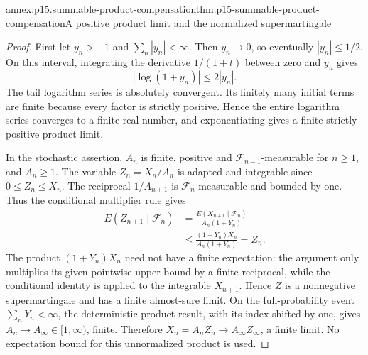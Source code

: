 \begin{annexitem}{annex:p15.summable-product-compensation}{thm:p15-summable-product-compensation}{A positive product limit and the normalized supermartingale}
\begin{proof}
First let \(y_n>-1\) and \(\sum_n|y_n|<\infty\).
Then \(y_n\to0\), so eventually \(|y_n|\leq1/2\).
On this interval, integrating the derivative \(1/(1+t)\)
between zero and \(y_n\) gives
\[
                           |\log(1+y_n)|\leq2|y_n|.
\]
The tail logarithm series is absolutely convergent.
Its finitely many initial terms are finite because every factor
is strictly positive. Hence the entire logarithm series converges
to a finite real number, and exponentiating gives a finite
strictly positive product limit.

In the stochastic assertion, \(A_n\) is finite, positive and
\(\mathcal F_{n-1}\)-measurable for \(n\geq1\), and \(A_n\geq1\).
The variable \(Z_n=X_n/A_n\) is adapted and integrable since
\(0\leq Z_n\leq X_n\).
The reciprocal \(1/A_{n+1}\) is \(\mathcal F_n\)-measurable
and bounded by one. Thus the conditional multiplier rule gives
\[
 \begin{aligned}
 E(Z_{n+1}\mid\mathcal F_n)
   &=\frac{E(X_{n+1}\mid\mathcal F_n)}{A_n(1+Y_n)}\\
   &\leq\frac{(1+Y_n)X_n}{A_n(1+Y_n)}=Z_n.
 \end{aligned}
\]
The product \((1+Y_n)X_n\) need not have a finite expectation:
the argument only multiplies its given pointwise upper bound
by a finite reciprocal, while the conditional identity is
applied to the integrable \(X_{n+1}\).
Hence \(Z\) is a nonnegative supermartingale and has a finite
almost-sure limit.
On the full-probability event \(\sum_nY_n<\infty\), the
deterministic product result, with its index shifted by one,
gives \(A_n\to A_\infty\in[1,\infty)\), finite.
Therefore \(X_n=A_nZ_n\to A_\infty Z_\infty\), a finite limit.
No expectation bound for this unnormalized product is used.
\end{proof}
\end{annexitem}

